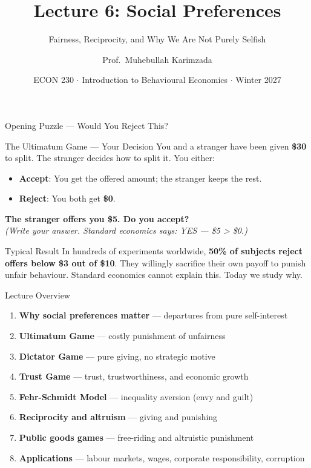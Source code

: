 \documentclass[aspectratio=169]{beamer}
\title{\textbf{Lecture 6: Social Preferences}}
\subtitle{Fairness, Reciprocity, and Why We Are Not Purely Selfish}
\author{Prof.\ Muhebullah Karimzada}
\institute{School of Economics, University of Northern British Columbia}
\date{ECON 230 $\cdot$ Introduction to Behavioural Economics $\cdot$ Winter 2027}
\begin{document}
\begin{frame}[plain]\titlepage\end{frame}

\begin{frame}{Opening Puzzle --- Would You Reject This?}
\begin{alertblock}{The Ultimatum Game --- Your Decision}
You and a stranger have been given \textbf{\$30} to split. The stranger decides how to split it. You either:
\begin{itemize}
  \item \textbf{Accept}: You get the offered amount; the stranger keeps the rest.
  \item \textbf{Reject}: You both get \textbf{\$0}.
\end{itemize}
\textbf{The stranger offers you \$5. Do you accept?}\\[0.4em]
\textit{(Write your answer. Standard economics says: YES --- \$5 > \$0.)}
\end{alertblock}
\pause
\begin{block}{Typical Result}
In hundreds of experiments worldwide, \textbf{50\% of subjects reject offers below \$3 out of \$10}. They willingly sacrifice their own payoff to punish unfair behaviour. Standard economics cannot explain this. Today we study why.
\end{block}
\end{frame}

\begin{frame}{Lecture Overview}
\begin{enumerate}[<+->]
  \item \textbf{Why social preferences matter} --- departures from pure self-interest
  \item \textbf{Ultimatum Game} --- costly punishment of unfairness
  \item \textbf{Dictator Game} --- pure giving, no strategic motive
  \item \textbf{Trust Game} --- trust, trustworthiness, and economic growth
  \item \textbf{Fehr-Schmidt Model} --- inequality aversion (envy and guilt)
  \item \textbf{Reciprocity and altruism} --- giving and punishing
  \item \textbf{Public goods games} --- free-riding and altruistic punishment
  \item \textbf{Applications} --- labour markets, wages, corporate responsibility, corruption
\end{enumerate}
\end{frame}
\end{document}
